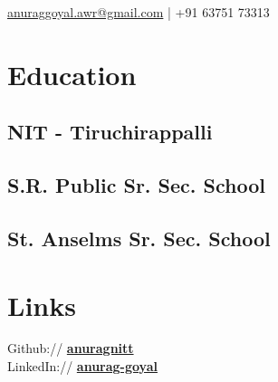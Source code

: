 \documentclass[]{deedy-resume-openfont}
\begin{document}
%
%
{ \href{mailto:anuraggoyal.awr@gmail.com}{anuraggoyal.awr@gmail.com} | +91 63751 73313
}

%
%

\begin{minipage}[t]{0.33\textwidth} 


\section{Education} 

\subsection{NIT - Tiruchirappalli}
\sectionsep

\subsection{S.R. Public Sr. Sec. School}
\sectionsep

\subsection{St. Anselms Sr. Sec. School}
\sectionsep


\section{Links} 
Github:// \href{https://github.com/anuragnitt}{\bf anuragnitt} \\
LinkedIn://  \href{https://www.linkedin.com/in/anurag-goyal-b5884a1ab/}{\bf anurag-goyal}
\sectionsep



\end{minipage}
\end{document}
